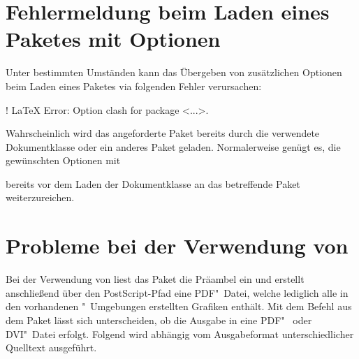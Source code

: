 \section{%
  Fehlermeldung beim Laden eines Paketes mit Optionen%
}
%
Unter bestimmten Umständen kann das Übergeben von zusätzlichen Optionen beim 
Laden eines Paketes via 
folgenden Fehler verursachen:
%
\begin{quoting}
\begin{Code}[escapechar=§]
! LaTeX Error: Option clash for package <...>.
\end{Code}
\end{quoting}
%
Wahrscheinlich wird das angeforderte Paket bereits durch die verwendete 
Dokumentklasse oder ein anderes Paket geladen. Normalerweise genügt es, die 
gewünschten Optionen mit
\begin{quoting}
\newline%
%
\end{quoting}
bereits vor dem Laden der Dokumentklasse an das betreffende Paket 
weiterzureichen.



\section{%
  Probleme bei der Verwendung von %
  \label{sec:tips:auto-pst-pdf}%
}
%
%
Bei der Verwendung von  liest das Paket  
die Präambel ein und erstellt anschließend über den PostScript-Pfad 
 eine PDF"~Datei, welche lediglich alle in den 
vorhandenen "~Umgebungen erstellten Grafiken enthält. 
Mit dem Befehl  aus dem Paket  lässt sich 
unterscheiden, ob die Ausgabe in eine PDF"~ oder DVI"~Datei erfolgt. Folgend 
wird abhängig vom Ausgabeformat unterschiedlicher Quelltext ausgeführt.
%
\begin{quoting}
\begin{Code}
\usepackage{iftex}
\end{Code}
\end{quoting}

